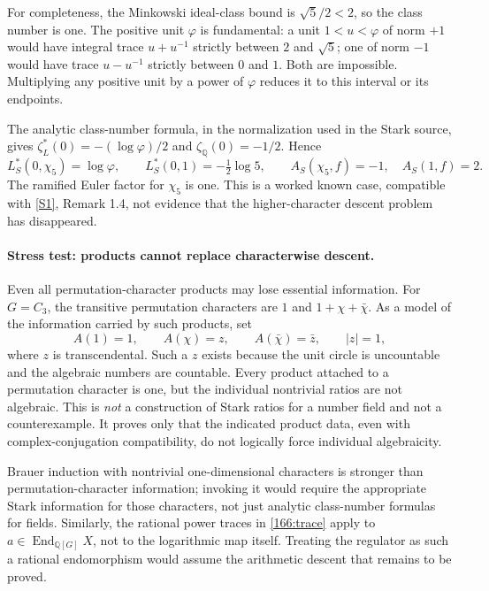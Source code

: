 \documentclass[11pt,a4paper]{article}
\newcommand{\Q}{\mathbb{Q}}
\newcommand{\sref}[2]{\hyperlink{source:#1:#2}{[S#2]}}
\numberwithin{equation}{section}
\begin{document}
For completeness, the Minkowski ideal-class bound is
$\sqrt5/2<2$, so the class number is one. The positive unit
$\varphi$ is fundamental: a unit $1<u<\varphi$ of norm $+1$ would
have integral trace $u+u^{-1}$ strictly between $2$ and $\sqrt5$;
one of norm $-1$ would have trace $u-u^{-1}$ strictly between $0$
and $1$. Both are impossible. Multiplying any positive unit by a
power of $\varphi$ reduces it to this interval or its endpoints.

The analytic class-number formula, in the normalization used in the
Stark source, gives $\zeta_L^*(0)=-(\log\varphi)/2$ and
$\zeta_{\Q}(0)=-1/2$. Hence
\begin{equation}
 L_S^*(0,\chi_5)=\log\varphi,
 \qquad L_S^*(0,1)=-\tfrac12\log5,
 \qquad A_S(\chi_5,f)=-1,\quad A_S(1,f)=2.
\end{equation}
The ramified Euler factor for $\chi_5$ is one. This is a worked known
case, compatible with \sref{166}{1}, Remark 1.4, not evidence that the
higher-character descent problem has disappeared.

\paragraph{Stress test: products cannot replace characterwise descent.}
Even all permutation-character products may lose essential information.
For $G=C_3$, the transitive permutation characters are $1$ and
$1+\chi+\bar\chi$. As a model of the information carried by such
products, set
\begin{equation}
 A(1)=1,\qquad A(\chi)=z,\qquad A(\bar\chi)=\bar z,
 \qquad |z|=1,
\end{equation}
where $z$ is transcendental. Such a $z$ exists because the unit circle
is uncountable and the algebraic numbers are countable. Every product
attached to a permutation character is one, but the individual
nontrivial ratios are not algebraic. This is \emph{not} a construction
of Stark ratios for a number field and not a counterexample. It proves
only that the indicated product data, even with complex-conjugation
compatibility, do not logically force individual algebraicity.

Brauer induction with nontrivial one-dimensional characters is stronger
than permutation-character information; invoking it would require the
appropriate Stark information for those characters, not just analytic
class-number formulas for fields. Similarly, the rational power traces
in \eqref{166:trace} apply to $a\in\operatorname{End}_{\Q[G]}X$, not to
the logarithmic map itself. Treating the regulator as such a rational
endomorphism would assume the arithmetic descent that remains to be
proved.
\end{document}
